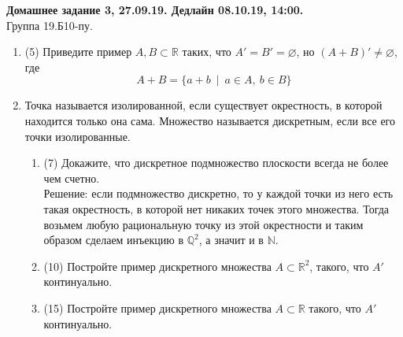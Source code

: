 \documentclass[a4paper]{article}
\begin{document}
\newcommand\HeaderDZ[5]{
\begin{center}
		\textbf{Домашнее задание #3, #2. Дедлайн #4, #5.}\\
		Группа #1.Б10-пу.\\
\end{center}
\vspace{-\baselineskip}
\bigskip
\bigskip
}



\renewcommand{\labelenumii}{\arabic{enumii})}
\renewcommand{\labelenumiii}{\roman{enumiii})}

\HeaderDZ{19}{27.09.19}{3}{08.10.19}{14:00}

\begin{enumerate}
    \item (5) Приведите пример $A, B\subset \mathbb R$ таких, что $A' = B' = \varnothing$, но $(A + B)'\neq \varnothing$, где
    \[
        A+B = \{a+b\ \mid\ a\in A,\ b\in B\}
    \]
    
    \item Точка называется изолированной, если существует окрестность, в которой находится только она сама. Множество называется дискретным, если все его точки изолированные. 
	\begin{enumerate}
		\item (7) Докажите, что дискретное подмножество плоскости всегда не более чем счетно.\\
		Решение: если подмножество дискретно, то у каждой точки из него есть такая окрестность, в которой нет никаких точек этого множества. Тогда возьмем любую рациональную точку из этой окрестности и таким образом сделаем инъекцию в $\mathbb Q^2$, а значит и в $\mathbb N$. 
		\item (10) Постройте пример дискретного множества $A\subset \mathbb R^2$, такого, что $A'$ континуально.
		\item (15) Постройте пример дискретного множества $A\subset\mathbb R$ такого, что $A'$ континуально.
	\end{enumerate}
	

\end{enumerate}
\end{document}
